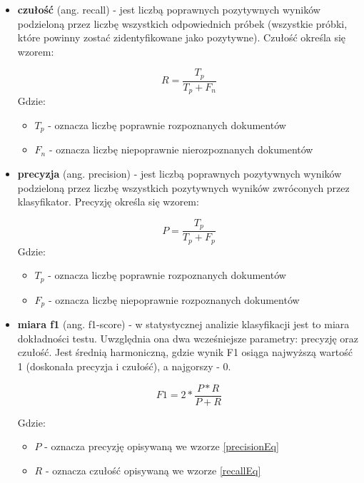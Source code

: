 \begin{itemize}
 \setlength\itemsep{2em}
\item \textbf{czułość} (ang. recall) - jest liczbą poprawnych pozytywnych wyników podzieloną przez liczbę wszystkich odpowiednich próbek (wszystkie próbki, które powinny zostać zidentyfikowane jako pozytywne). \cite{skl-reference} Czułość określa się wzorem:

\begin{equation}
\label{recallEq}
R = \frac{T_{p}}{T_{p} + F_{n}}
\end{equation}
Gdzie:
\begin{itemize}
\item $T_{p}$ - oznacza liczbę poprawnie rozpoznanych dokumentów
\item $F_{n}$ - oznacza liczbę niepoprawnie nierozpoznanych dokumentów
\end{itemize}

\item \textbf{precyzja} (ang. precision) - jest liczbą poprawnych pozytywnych wyników podzieloną przez liczbę wszystkich pozytywnych wyników zwróconych przez klasyfikator. \cite{skl-reference} Precyzję określa się wzorem:

\begin{equation}
\label{precisionEq}
P = \frac{T_{p}}{T_{p} + F_{p}}
\end{equation}
Gdzie:
\begin{itemize}
\item $T_{p}$ - oznacza liczbę poprawnie rozpoznanych dokumentów
\item $F_{p}$ - oznacza liczbę niepoprawnie rozpoznanych dokumentów
\end{itemize}

\item \textbf{miara f1} (ang. f1-score) - w statystycznej analizie klasyfikacji jest to miara dokładności testu. Uwzględnia ona dwa wcześniejsze parametry: precyzję oraz czułość. Jest średnią harmoniczną, gdzie wynik F1 osiąga najwyższą wartość 1 (doskonała precyzja i czułość), a najgorszy - 0. \cite{miary-jakosci}

\begin{equation}
F1 = 2*\frac{P * R}{P+R}
\end{equation}

Gdzie:
\begin{itemize}
\item $P$ - oznacza precyzję opisywaną we wzorze \ref{precisionEq}
\item $R$ - oznacza czułość opisywaną we wzorze \ref{recallEq}
\end{itemize}


\end{itemize}
